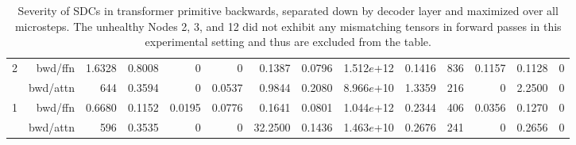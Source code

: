 \begin{table*}[t]
\begin{center}
\begin{tiny}
\begin{sc}
\begin{tabular}{rrrrrrrrrrrrrr}
\midrule
\multirow{2}{*}{2} & bwd/ffn & 1.6328 & 0.8008 & 0 & 0 & 0.1387 & 0.0796 & 1.512$e$+12 & 0.1416 & 836 & 0.1157 & 0.1128 & 0 \\
 & bwd/attn & 644 & 0.3594 & 0 & 0.0537 & 0.9844 & 0.2080 & 8.966$e$+10 & 1.3359 & 216 & 0 & 2.2500 & 0 \\
\midrule
\multirow{2}{*}{1} & bwd/ffn & 0.6680 & 0.1152 & 0.0195 & 0.0776 & 0.1641 & 0.0801 & 1.044$e$+12 & 0.2344 & 406 & 0.0356 & 0.1270 & 0 \\
 & bwd/attn & 596 & 0.3535 & 0 & 0 & 32.2500 & 0.1436 & 1.463$e$+10 & 0.2676 & 241 & 0 & 0.2656 & 0 \\
 \bottomrule
\end{tabular}

\end{sc}
\end{tiny}
\end{center}
\vskip 0.15in

\caption{Severity of SDCs in transformer primitive backwards, separated down by decoder layer and maximized over all microsteps. The unhealthy Nodes 2, 3, and 12 did not exhibit any mismatching tensors in forward passes in this experimental setting and thus are excluded from the table.}

\label{fig:backwards_primitive_max_severity}
\end{table*}